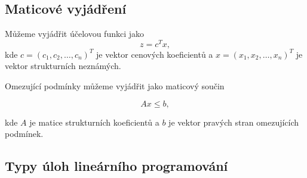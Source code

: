 \subsection{Maticové vyjádření}

Můžeme vyjádřit účelovou funkci jako $$ z = c^Tx ,$$
kde $c = (c_1, c_2, \ldots, c_n)^T$ je vektor cenových koeficientů a $x = (x_1, x_2, \ldots, x_n)^T$ je vektor strukturních neznámých.

Omezující podmínky můžeme vyjádřit jako maticový součin

$$ Ax \leq b ,$$

kde $A$ je matice strukturních koeficientů a $b$ je vektor pravých stran omezujících podmínek.

\subsection{Typy úloh lineárního programování}